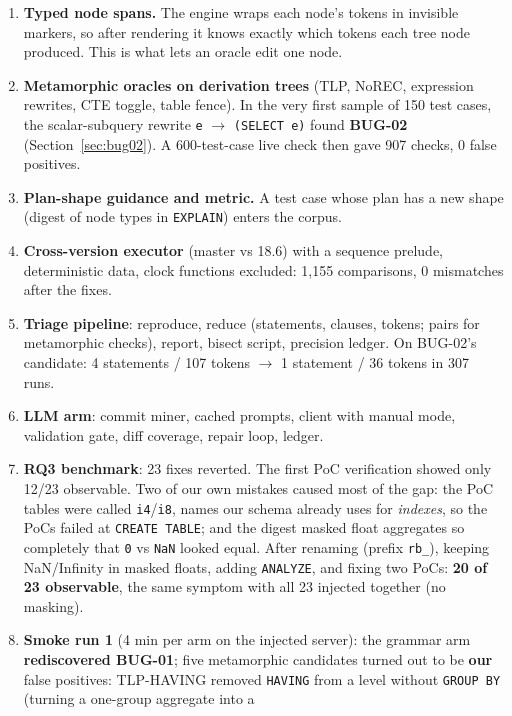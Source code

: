 \begin{enumerate}
  \item \textbf{Typed node spans.} The engine wraps each node's tokens in
    invisible markers, so after rendering it knows exactly which tokens each
    tree node produced. This is what lets an oracle edit one node.
  \item \textbf{Metamorphic oracles on derivation trees} (TLP, NoREC,
    expression rewrites, CTE toggle, table fence). In the very first sample
    of 150 test cases, the scalar-subquery rewrite \texttt{e} $\rightarrow$
    \texttt{(SELECT e)} found \textbf{BUG-02} (Section~\ref{sec:bug02}).
    A 600-test-case live check then gave 907 checks, 0 false positives.
  \item \textbf{Plan-shape guidance and metric.} A test case whose plan has a
    new shape (digest of node types in \texttt{EXPLAIN}) enters the corpus.
  \item \textbf{Cross-version executor} (master vs 18.6) with a sequence
    prelude, deterministic data, clock functions excluded: 1{,}155 comparisons,
    0 mismatches after the fixes.
  \item \textbf{Triage pipeline}: reproduce, reduce (statements, clauses,
    tokens; pairs for metamorphic checks), report, bisect script, precision
    ledger. On BUG-02's candidate: 4 statements / 107 tokens $\rightarrow$
    1 statement / 36 tokens in 307 runs.
  \item \textbf{LLM arm}: commit miner, cached prompts, client with manual
    mode, validation gate, diff coverage, repair loop, ledger.
  \item \textbf{RQ3 benchmark}: 23 fixes reverted. The first PoC verification
    showed only 12/23 observable. Two of our own mistakes caused most of the
    gap: the PoC tables were called \texttt{i4}/\texttt{i8}, names our schema
    already uses for \emph{indexes}, so the PoCs failed at \texttt{CREATE TABLE};
    and the digest masked float aggregates so completely that \texttt{0} vs
    \texttt{NaN} looked equal. After renaming (prefix \texttt{rb\_}), keeping
    NaN/Infinity in masked floats, adding \texttt{ANALYZE}, and fixing two PoCs:
    \textbf{20 of 23 observable}, the same symptom with all 23 injected
    together (no masking).
  \item \textbf{Smoke run 1} (4 min per arm on the injected server): the
    grammar arm \textbf{rediscovered BUG-01}; five metamorphic candidates turned
    out to be \textbf{our} false positives: TLP-HAVING removed \texttt{HAVING}
    from a level without \texttt{GROUP BY} (turning a one-group aggregate into a

\end{enumerate}
